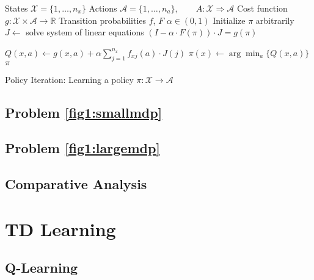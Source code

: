 \documentclass[letter]{article}
\begin{document}
\begin{algorithm}[H]
    \begin{algorithmic}
    \Require
    \Statex States $\mathcal{X} = \{1, \dots, n_x\}$
    \Statex Actions $\mathcal{A} = \{1, \dots, n_a\},\qquad A: \mathcal{X} \Rightarrow \mathcal{A}$
    \Statex Cost function $g: \mathcal{X} \times \mathcal{A} \rightarrow \mathbb{R}$
    \Statex Transition probabilities $f$, $F$
    \Statex $\alpha \in (0, 1)$
        \State Initialize $\pi$ arbitrarily
            \State $J \gets$ solve system of linear equations $(I - \alpha \cdot F(\pi)) \cdot J = g(\pi)$

                    \State $Q(x, a) \gets g(x, a) + \alpha \sum_{j=1}^{n_x} f_{xj}(a) \cdot J(j)$
                \EndFor
            \EndFor
                \State $\pi(x) \gets \arg \min_a \{Q(x, a)\}$
            \EndFor
        \EndWhile
        \Return $\pi$
    \EndProcedure
    \end{algorithmic}
\caption{Policy Iteration: Learning a policy $\pi: \mathcal{X} \rightarrow \mathcal{A}$}
\label{alg:policy-iteration}
\end{algorithm}

\subsection{Problem \ref{fig1:smallmdp}}

\subsection{Problem \ref{fig1:largemdp}}
\subsection{Comparative Analysis}
\section{TD Learning}
\subsection{Q-Learning}




\printbibliography
\end{document}
